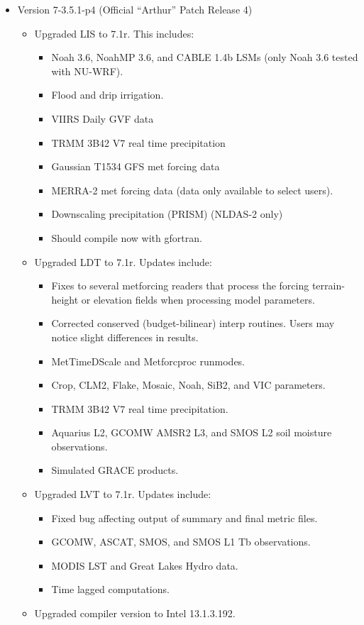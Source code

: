 \begin{itemize}
\item Version 7-3.5.1-p4 (Official ``Arthur'' Patch Release 4)
  \begin{itemize}
  \item Upgraded LIS to 7.1r. This includes:
    \begin{itemize}
      \item Noah 3.6, NoahMP 3.6, and CABLE 1.4b LSMs (only Noah 3.6 tested 
        with NU-WRF).
      \item Flood and drip irrigation.
      \item VIIRS Daily GVF data
      \item TRMM 3B42 V7 real time precipitation
      \item Gaussian T1534 GFS met forcing data
      \item MERRA-2 met forcing data (data only available to select
users).
      \item Downscaling precipitation (PRISM) (NLDAS-2 only)
      \item Should compile now with gfortran.
    \end{itemize}
  \item Upgraded LDT to 7.1r. Updates include:
    \begin{itemize}
    \item Fixes to several metforcing readers that process the forcing 
terrain-height or elevation fields when processing model parameters.
    \item Corrected conserved (budget-bilinear) interp routines. Users may 
notice slight differences in results.
    \item MetTimeDScale and Metforcproc runmodes.
    \item Crop, CLM2, Flake, Mosaic, Noah, SiB2, and VIC parameters.
    \item TRMM 3B42 V7 real time precipitation.
    \item Aquarius L2, GCOMW AMSR2 L3, and SMOS L2 soil moisture observations.
    \item Simulated GRACE products.
    \end{itemize}
  \item Upgraded LVT to 7.1r. Updates include:
    \begin{itemize}
    \item Fixed bug affecting output of summary and final metric files.
    \item GCOMW, ASCAT, SMOS, and SMOS L1 Tb observations.
    \item MODIS LST and Great Lakes Hydro data.
    \item Time lagged computations.
    \end{itemize}
  \item Upgraded compiler version to Intel 13.1.3.192.
  \end{itemize}


\end{itemize}
